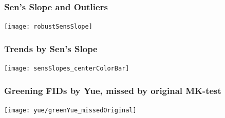 \documentclass[serif, xcolor={dvipsnames}]{beamer} %
\begin{document}
\begin{frame}
 \frametitle{Sen's Slope and Outliers}
\begin{center}
\texttt{[image: robustSensSlope]}
\end{center}
\end{frame}
\begin{frame}
\frametitle{Trends by Sen's Slope}
\begin{center}
\texttt{[image: sensSlopes\_centerColorBar]}
\end{center}
\end{frame}
\begin{frame}
\frametitle{Greening FIDs by Yue, missed by original MK-test}
\begin{center}
\texttt{[image: yue/greenYue\_missedOriginal]}
\end{center}
\end{frame}
\end{document}
